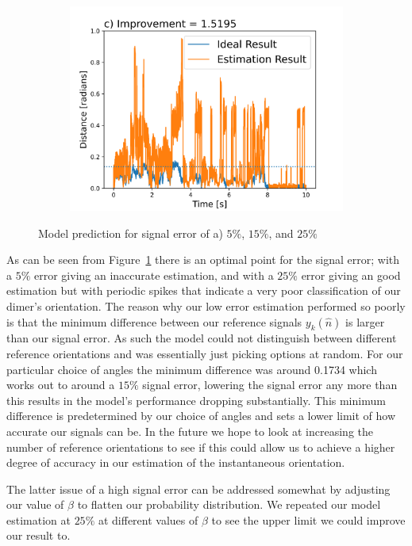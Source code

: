 \documentclass[final, 3p]{elsarticle}
\begin{document}
\begin{figure}[h]
\begin{subfigure}{0.32\textwidth}
		\includegraphics[width=\textwidth]{./Images/epsilon_25.png}
	\end{subfigure}
	\caption{Model prediction for signal error of a) $5\%$, $15\%$, and $25\%$}
	\label{fig:epsilon}
\end{figure}

As can be seen from Figure~\ref{fig:epsilon} there is an optimal point for the signal error; with a $5\%$ error giving an inaccurate estimation, and with a $25\%$ error giving an good estimation but with periodic spikes that indicate a very poor classification of our dimer's orientation. The reason why our low error estimation performed so poorly is that the minimum difference between our reference signals $y_k(\hat{n})$ is larger than our signal error.  As such the model could not distinguish between different reference orientations and was essentially just picking options at random. For our particular choice of angles the minimum difference was around 0.1734 which works out to around a $15\%$ signal error, lowering the signal error any more than this results in the model's performance dropping substantially. This minimum difference is predetermined by our choice of angles and sets a lower limit of how accurate our signals can be. In the future we hope to look at increasing the number of reference orientations to see if this could allow us to achieve a higher degree of accuracy in our estimation of the instantaneous orientation.   

The latter issue of a high signal error can be addressed somewhat by adjusting our value of $\beta$ to flatten our probability distribution. We repeated our model estimation at $25\%$ at different values of $\beta$ to see the upper limit we could improve our result to.    
\end{document}

